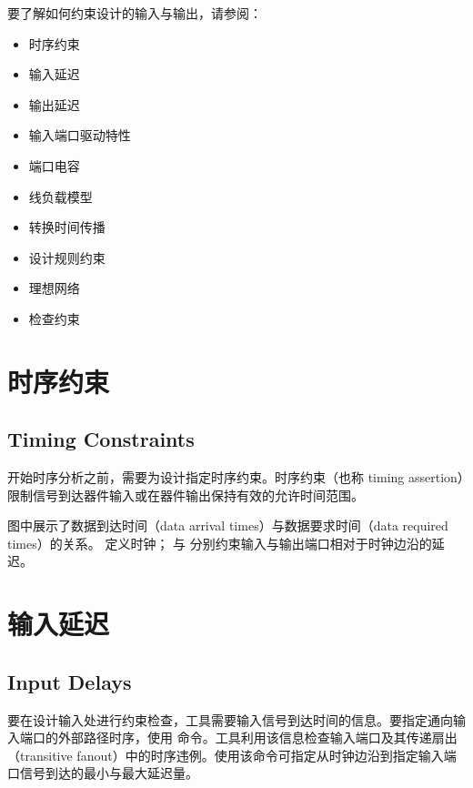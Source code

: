 \label{chap:constrain}

要了解如何约束设计的输入与输出，请参阅：
\begin{itemize}
  \item 时序约束
  \item 输入延迟
  \item 输出延迟
  \item 输入端口驱动特性
  \item 端口电容
  \item 线负载模型
  \item 转换时间传播
  \item 设计规则约束
  \item 理想网络
  \item 检查约束
\end{itemize}

\section{时序约束}
\subsection*{Timing Constraints}

开始时序分析之前，需要为设计指定时序约束。时序约束（也称 timing assertion）限制信号到达器件输入或在器件输出保持有效的允许时间范围。


图中展示了数据到达时间（data arrival times）与数据要求时间（data required times）的关系。 定义时钟； 与  分别约束输入与输出端口相对于时钟边沿的延迟。

\section{输入延迟}
\subsection*{Input Delays}

要在设计输入处进行约束检查，工具需要输入信号到达时间的信息。要指定通向输入端口的外部路径时序，使用  命令。工具利用该信息检查输入端口及其传递扇出（transitive fanout）中的时序违例。使用该命令可指定从时钟边沿到指定输入端口信号到达的最小与最大延迟量。

